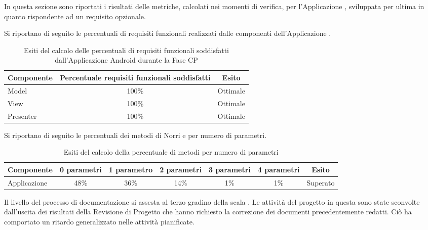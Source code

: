 In questa sezione sono riportati i risultati delle metriche, calcolati nei momenti di verifica, per l'Applicazione , sviluppata per ultima in quanto rispondente ad un requisito opzionale.

Si riportano di seguito le percentuali di requisiti funzionali realizzati dalle componenti dell'Applicazione .
\begin{table}[H]
	\centering
		\begin{tabu}{| l | c | c |}
			\hline
			Componente	& Percentuale requisiti funzionali soddisfatti	& Esito		\\ \hline \hline
			Model	& 100\% 	& Ottimale  \\ \hline
			View  & 	100\%	& Ottimale  \\ \hline
			Presenter  & 	100\%	& Ottimale  \\ \hline
		\end{tabu}
	\caption{Esiti del calcolo delle percentuali di requisiti funzionali soddisfatti dall'Applicazione Android durante la Fase CP}
\end{table}

Si riportano di seguito le percentuali dei metodi di Norri e  per numero di parametri.
\begin{table}[H]
	\centering
		\begin{tabu}{| l | c | c | c | c | c | c |}
			\hline
			Componente	& 0 parametri & 1 parametro & 2 parametri & 3 parametri & 4 parametri & Esito		\\ \hline \hline
			Applicazione 	& 48\% & 36\% & 14\% & 1\% & 1\%	& Superato  \\ \hline
		\end{tabu}
	\caption{Esiti del calcolo della percentuale di metodi per numero di parametri}
\end{table}


 

Il livello del processo di documentazione si assesta al terzo gradino della scala .
Le attività del progetto in questa  sono state sconvolte dall'uscita dei risultati della Revisione di Progetto che hanno richiesto la correzione dei documenti precedentemente redatti. Ciò ha comportato un ritardo generalizzato nelle attività pianificate.

